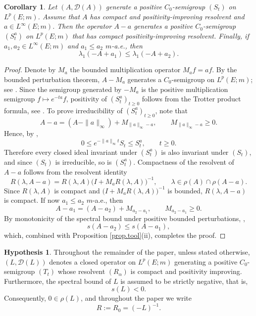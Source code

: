 \documentclass[11pt,a4paper,reqno]{amsart}
\newtheorem{corollary}[theorem]{\bf Corollary}
\theoremstyle{definition}
\newtheorem{hypothesis}[theorem]{Hypothesis}
\numberwithin{equation}{section}
\begin{document}
\begin{corollary}
\label{cor.pert1}
Let $(A,\mathscr D(A))$ generate a positive $C_0$-semigroup $(S_t)$ on $L^p(E;m)$.
Assume that $A$ has compact and positivity-improving resolvent and  $a\in L^\infty(E;m)$.
Then the operator $A-a$
generates a positive $C_0$-semigroup $(S_t^a)$ on $L^p(E;m)$ that 
has compact positivity-improving resolvent.
Finally, if $a_1,a_2\in L^\infty(E;m)$  and
$a_1\le a_2$ $m$-a.e., then
\[
\lambda_1(-A+a_1)\le \lambda_1(-A+a_2).
\]
\end{corollary}

\begin{proof}
Denote by $M_a$ the bounded
multiplication operator $M_af=af$. By the bounded perturbation theorem,
$A-M_a$ generates a $C_0$-semigroup on $L^p(E;m)$; see
\cite[Theorem III.1.3]{EngelNagel2000}.
Since the semigroup generated by $-M_a$ is the positive multiplication semigroup
$f\mapsto e^{-ta}f$, positivity of $(S_t^a)_{t\ge0}$ follows from the Trotter product
formula, see \cite[Corollary III.5.8]{EngelNagel2000}.
To prove irreducibility of $(S_t^a)_{t\ge0}$, note that
\[
A-a=(A-\|a\|_\infty )+M_{\|a\|_\infty-a},
\qquad M_{\|a\|_\infty-a}\ge0.
\]
Hence, by \cite[Corollary VI.1.11(i)]{EngelNagel2000},
\[
0\le e^{-\|a\|_\infty t}S_t\le S_t^a,
\qquad t\ge0.
\]
Therefore every closed ideal invariant under $(S_t^a)$ is also invariant under
$(S_t)$, and since $(S_t)$ is irreducible, so is $(S_t^a)$.
Compactness of the resolvent of $A-a$ follows from the  resolvent identity
\[
R(\lambda,A-a)=R(\lambda,A)\bigl(I+M_aR(\lambda,A)\bigr)^{-1},
\qquad \lambda\in\rho(A)\cap\rho(A-a).
\]
Since $R(\lambda,A)$ is compact and $\bigl(I+M_aR(\lambda,A)\bigr)^{-1}$ is bounded,
$R(\lambda,A-a)$ is compact.
If now $a_1\le a_2$ $m$-a.e., then
\[
A-a_1=(A-a_2)+M_{a_2-a_1},
\qquad M_{a_2-a_1}\ge0.
\]
By monotonicity of the spectral bound under positive bounded perturbations,
\cite[Corollary VI.1.11(ii)]{EngelNagel2000},
\[
s(A-a_2)\le s(A-a_1),
\]
which, combined with Proposition \ref{prop.tool}(ii),   completes the proof.
\end{proof}

\begin{hypothesis}
\label{hyp.spectral-bound}
Throughout the remainder of the paper, unless stated otherwise,
$(L,\mathscr D(L))$ denotes a closed operator on $L^p(E;m)$ generating a positive $C_0$-semigroup $(T_t)$
whose resolvent $(R_\alpha)$  is compact and positivity improving.
Furthermore,  the spectral bound of $L$ is
assumed to be  strictly negative, that is,
\[
s(L)<0.
\]
Consequently, $0\in\rho(L)$, and throughout the paper we write
\[
R:=R_0=(-L)^{-1}.
\]
\end{hypothesis}
\end{document}
